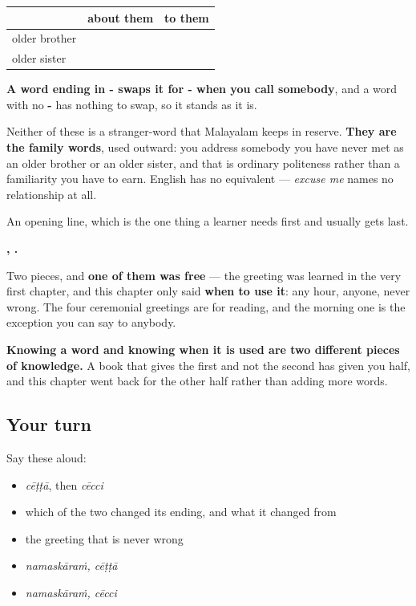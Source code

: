 \begin{grammarlens}[title={Grammar Lens: two things a stranger needs}]
\noindent
\begin{tabularx}{\linewidth}{@{}>{\raggedright\arraybackslash}X>{\raggedright\arraybackslash}X>{\raggedright\arraybackslash}X@{}}
\toprule
\textbf{} & \textbf{about them} & \textbf{\textbf{to} them} \\
\midrule
older brother & \textbf{\ml{ചേട്ടൻ}} & \textbf{\ml{ചേട്ടാ}} \\
older sister & \textbf{\ml{ചേച്ചി}} & \textbf{\ml{ചേച്ചി}} \\
\bottomrule
\end{tabularx}

\textbf{A word ending in - swaps it for - when you call somebody}, and a word with no \textbf{-} has nothing to swap, so it stands as it is.

Neither of these is a stranger-word that Malayalam keeps in reserve. \textbf{They are the family words}, used outward: you address somebody you have never met as an older brother or an older sister, and that is ordinary politeness rather than a familiarity you have to earn. English has no equivalent — \emph{excuse me} names no relationship at all.
\end{grammarlens}

\begin{grammarlens}[title={What you've built}]
An opening line, which is the one thing a learner needs first and usually gets last.

\textbf{, .}

Two pieces, and \textbf{one of them was free} — the greeting was learned in the very first chapter, and this chapter only said \textbf{when to use it}: any hour, anyone, never wrong. The four ceremonial greetings are for reading, and the morning one is the exception you can say to anybody.

\textbf{Knowing a word and knowing when it is used are two different pieces of knowledge.} A book that gives the first and not the second has given you half, and this chapter went back for the other half rather than adding more words.
\end{grammarlens}

\subsection*{Your turn}
Say these aloud:

\begin{itemize}
\raggedright
  \item \emph{cēṭṭā}, then \emph{cēcci}
  \item which of the two changed its ending, and what it changed from
  \item the greeting that is never wrong
  \item \emph{namaskāraṁ, cēṭṭā}
  \item \emph{namaskāraṁ, cēcci}
\end{itemize}


